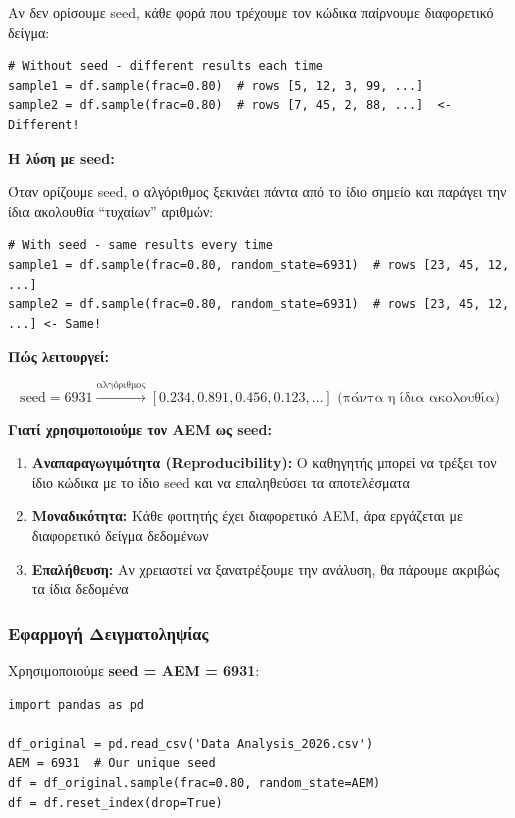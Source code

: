 \documentclass[12pt,a4paper]{article}
\begin{document}
Αν δεν ορίσουμε seed, κάθε φορά που τρέχουμε τον κώδικα παίρνουμε διαφορετικό δείγμα:

\begin{lstlisting}
# Without seed - different results each time
sample1 = df.sample(frac=0.80)  # rows [5, 12, 3, 99, ...]
sample2 = df.sample(frac=0.80)  # rows [7, 45, 2, 88, ...]  <- Different!
\end{lstlisting}

\textbf{Η λύση με seed:}

Όταν ορίζουμε seed, ο αλγόριθμος ξεκινάει πάντα από το ίδιο σημείο και παράγει την ίδια ακολουθία ``τυχαίων'' αριθμών:

\begin{lstlisting}
# With seed - same results every time
sample1 = df.sample(frac=0.80, random_state=6931)  # rows [23, 45, 12, ...]
sample2 = df.sample(frac=0.80, random_state=6931)  # rows [23, 45, 12, ...] <- Same!
\end{lstlisting}

\textbf{Πώς λειτουργεί:}

$$\text{seed} = 6931 \xrightarrow{\text{αλγόριθμος}} [0.234, 0.891, 0.456, 0.123, \ldots] \text{ (πάντα η ίδια ακολουθία)}$$

\textbf{Γιατί χρησιμοποιούμε τον ΑΕΜ ως seed:}

\begin{enumerate}
    \item \textbf{Αναπαραγωγιμότητα (Reproducibility):} Ο καθηγητής μπορεί να τρέξει τον ίδιο κώδικα με το ίδιο seed και να επαληθεύσει τα αποτελέσματα
    \item \textbf{Μοναδικότητα:} Κάθε φοιτητής έχει διαφορετικό ΑΕΜ, άρα εργάζεται με διαφορετικό δείγμα δεδομένων
    \item \textbf{Επαλήθευση:} Αν χρειαστεί να ξανατρέξουμε την ανάλυση, θα πάρουμε ακριβώς τα ίδια δεδομένα
\end{enumerate}

\subsubsection{Εφαρμογή Δειγματοληψίας}

Χρησιμοποιούμε \textbf{seed = AEM = 6931}:

\begin{lstlisting}
import pandas as pd

df_original = pd.read_csv('Data Analysis_2026.csv')
AEM = 6931  # Our unique seed
df = df_original.sample(frac=0.80, random_state=AEM)
df = df.reset_index(drop=True)
\end{lstlisting}
\end{document}
